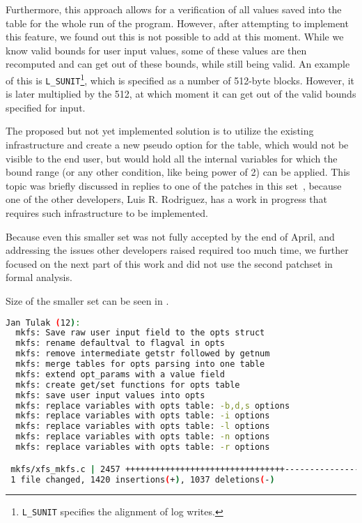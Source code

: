 Furthermore, this approach allows for a verification of all values saved into
the table for the whole run of the program. However, after attempting to
implement this feature, we found out this is not possible to add at this moment.
While we know valid bounds for user input values, some of these values are then
recomputed and can get out of these bounds, while still being valid. An example
of this is {\tt L\_SUNIT}\footnote{{\tt L\_SUNIT} specifies the alignment of
log writes.}, which is specified as a number of 512-byte blocks. However, it is
later multiplied by the 512, at which moment it can get out of the valid bounds
specified for input.

The proposed but not yet implemented solution is to utilize the existing
infrastructure and create a new pseudo option for the table, which would not be
visible to the end user, but would hold all the internal variables for which
the bound range (or any other condition, like being power of 2) can be applied.
This topic was briefly discussed in replies to one of the patches in this
set~\cite{secondSetSplitOtherVars}, because one of the other developers, Luis
R. Rodriguez, has a work in progress that requires such infrastructure to be
implemented.

Because even this smaller set was not fully accepted by the end of April,
and addressing the issues other developers raised required too much time, we
further focused on the next part of
this work and did not use the second patchset in formal analysis.

Size of the smaller set can be seen in
.
\begin{lstlisting}[frame=none, basicstyle=\footnotesize\ttfamily,
language=Bash, numbers=none, numberstyle=\tiny\color{black},caption= {Git
statistics for the first part of the second set after its breaking into
smaller parts~\cite{secondSetSplitFirst}.},
label={lst:refactoring:firstSmallerGit}]
Jan Tulak (12):
  mkfs: Save raw user input field to the opts struct
  mkfs: rename defaultval to flagval in opts
  mkfs: remove intermediate getstr followed by getnum
  mkfs: merge tables for opts parsing into one table
  mkfs: extend opt_params with a value field
  mkfs: create get/set functions for opts table
  mkfs: save user input values into opts
  mkfs: replace variables with opts table: -b,d,s options
  mkfs: replace variables with opts table: -i options
  mkfs: replace variables with opts table: -l options
  mkfs: replace variables with opts table: -n options
  mkfs: replace variables with opts table: -r options

 mkfs/xfs_mkfs.c | 2457 ++++++++++++++++++++++++++++++++-----------------------
 1 file changed, 1420 insertions(+), 1037 deletions(-)
\end{lstlisting}


